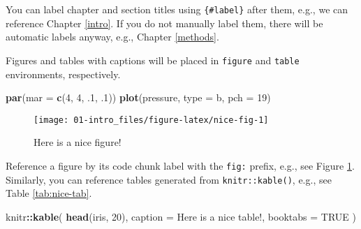 \documentclass[
  cn,11pt,chinese,bibstyle=apalike]{elegantbook}
\newenvironment{Shaded}{\begin{snugshade}}{\end{snugshade}}
\newcommand{\DataTypeTok}[1]{\textcolor[rgb]{0.13,0.29,0.53}{#1}}
\newcommand{\DecValTok}[1]{\textcolor[rgb]{0.00,0.00,0.81}{#1}}
\newcommand{\FloatTok}[1]{\textcolor[rgb]{0.00,0.00,0.81}{#1}}
\newcommand{\KeywordTok}[1]{\textcolor[rgb]{0.13,0.29,0.53}{\textbf{#1}}}
\newcommand{\NormalTok}[1]{#1}
\newcommand{\OperatorTok}[1]{\textcolor[rgb]{0.81,0.36,0.00}{\textbf{#1}}}
\newcommand{\OtherTok}[1]{\textcolor[rgb]{0.56,0.35,0.01}{#1}}
\newcommand{\StringTok}[1]{\textcolor[rgb]{0.31,0.60,0.02}{#1}}
\begin{document}
You can label chapter and section titles using \texttt{\{\#label\}} after them, e.g., we can reference Chapter \ref{intro}. If you do not manually label them, there will be automatic labels anyway, e.g., Chapter \ref{methods}.

Figures and tables with captions will be placed in \texttt{figure} and \texttt{table} environments, respectively.

\begin{Shaded}
\begin{Highlighting}[]
\KeywordTok{par}\NormalTok{(}\DataTypeTok{mar =} \KeywordTok{c}\NormalTok{(}\DecValTok{4}\NormalTok{, }\DecValTok{4}\NormalTok{, }\FloatTok{.1}\NormalTok{, }\FloatTok{.1}\NormalTok{))}
\KeywordTok{plot}\NormalTok{(pressure, }\DataTypeTok{type =} \StringTok{\textquotesingle{}b\textquotesingle{}}\NormalTok{, }\DataTypeTok{pch =} \DecValTok{19}\NormalTok{)}
\end{Highlighting}
\end{Shaded}

\begin{figure}

{\centering \texttt{[image: 01-intro\_files/figure-latex/nice-fig-1]} 

}

\caption{Here is a nice figure!}\label{fig:nice-fig}
\end{figure}

Reference a figure by its code chunk label with the \texttt{fig:} prefix, e.g., see Figure \ref{fig:nice-fig}. Similarly, you can reference tables generated from \texttt{knitr::kable()}, e.g., see Table \ref{tab:nice-tab}.

\begin{Shaded}
\begin{Highlighting}[]
\NormalTok{knitr}\OperatorTok{::}\KeywordTok{kable}\NormalTok{(}
  \KeywordTok{head}\NormalTok{(iris, }\DecValTok{20}\NormalTok{), }\DataTypeTok{caption =} \StringTok{\textquotesingle{}Here is a nice table!\textquotesingle{}}\NormalTok{,}
  \DataTypeTok{booktabs =} \OtherTok{TRUE}
\NormalTok{)}
\end{Highlighting}
\end{Shaded}
\end{document}
